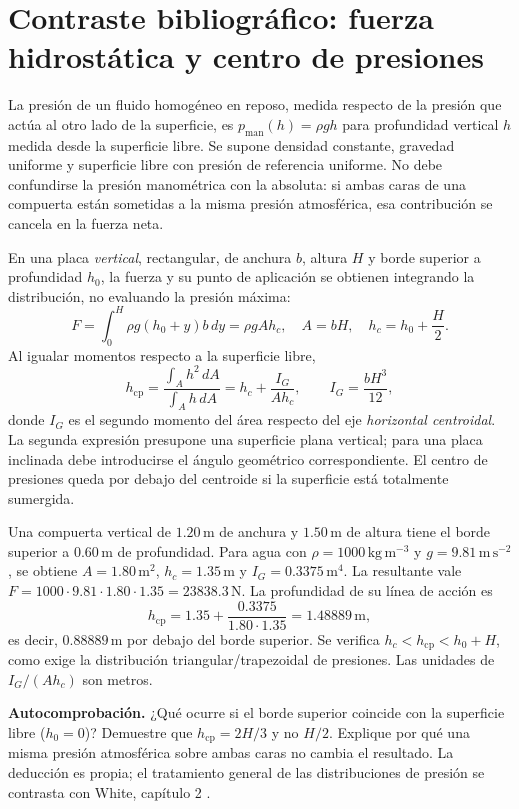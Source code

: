
\section{Contraste bibliográfico: fuerza hidrostática y centro de presiones}
\label{sec:ref26-hidro}

La presión de un fluido homogéneo en reposo, medida respecto de la presión que actúa al otro lado de la superficie, es \(p_{\mathrm{man}}(h)=\rho gh\) para profundidad vertical \(h\) medida desde la superficie libre. Se supone densidad constante, gravedad uniforme y superficie libre con presión de referencia uniforme. No debe confundirse la presión manométrica con la absoluta: si ambas caras de una compuerta están sometidas a la misma presión atmosférica, esa contribución se cancela en la fuerza neta.

En una placa \emph{vertical}, rectangular, de anchura \(b\), altura \(H\) y borde superior a profundidad \(h_0\), la fuerza y su punto de aplicación se obtienen integrando la distribución, no evaluando la presión máxima:
\begin{equation}
 F=\int_0^H \rho g(h_0+y)b\,dy
   =\rho g A h_c,\quad
 A=bH,\quad h_c=h_0+\frac{H}{2}.
 \label{eq:ref26-hidro-fuerza}
\end{equation}
Al igualar momentos respecto a la superficie libre,
\begin{equation}
 h_{\mathrm{cp}}
 =\frac{\int_A h^2\,dA}{\int_A h\,dA}
 =h_c+\frac{I_G}{Ah_c},\qquad I_G=\frac{bH^3}{12},
 \label{eq:ref26-hidro-cp}
\end{equation}
donde \(I_G\) es el segundo momento del área respecto del eje \emph{horizontal centroidal}. La segunda expresión presupone una superficie plana vertical; para una placa inclinada debe introducirse el ángulo geométrico correspondiente. El centro de presiones queda por debajo del centroide si la superficie está totalmente sumergida.

\begin{tcolorbox}[title={Ejemplo guiado original: compuerta}, studiumdef, breakable]
Una compuerta vertical de \(1.20\,\mathrm{m}\) de anchura y \(1.50\,\mathrm{m}\) de altura tiene el borde superior a \(0.60\,\mathrm{m}\) de profundidad. Para agua con \(\rho=1000\,\mathrm{kg\,m^{-3}}\) y \(g=9.81\,\mathrm{m\,s^{-2}}\), se obtiene \(A=1.80\,\mathrm{m^2}\), \(h_c=1.35\,\mathrm{m}\) y \(I_G=0.3375\,\mathrm{m^4}\).
La resultante vale \(F=1000\cdot9.81\cdot1.80\cdot1.35=\mathbf{23838.3\,\mathrm{N}}\).
La profundidad de su línea de acción es
\[
 h_{\mathrm{cp}}=1.35+\frac{0.3375}{1.80\cdot1.35}
 =\mathbf{1.48889\,\mathrm{m}},
\]
es decir, \(0.88889\,\mathrm{m}\) por debajo del borde superior. Se verifica \(h_c<h_{\mathrm{cp}}<h_0+H\), como exige la distribución triangular/trapezoidal de presiones. Las unidades de \(I_G/(Ah_c)\) son metros.
\end{tcolorbox}

\textbf{Autocomprobación.} ¿Qué ocurre si el borde superior coincide con la superficie libre (\(h_0=0\))? Demuestre que \(h_{\mathrm{cp}}=2H/3\) y no \(H/2\). Explique por qué una misma presión atmosférica sobre ambas caras no cambia el resultado. La deducción es propia; el tratamiento general de las distribuciones de presión se contrasta con White, capítulo 2 \cite{ref26-white}.
